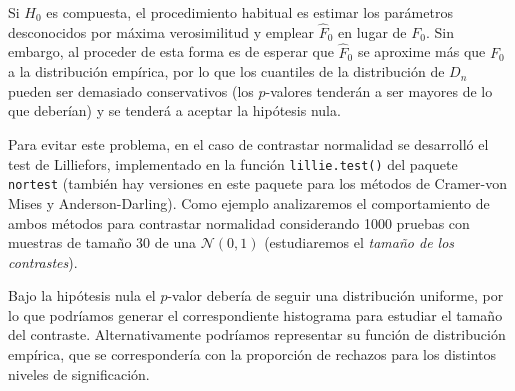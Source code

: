 \documentclass[
]{book}
\newenvironment{Shaded}{\begin{snugshade}}{\end{snugshade}}
\newcommand{\CommentTok}[1]{\textcolor[rgb]{0.56,0.35,0.01}{\textit{#1}}}
\newcommand{\ControlFlowTok}[1]{\textcolor[rgb]{0.13,0.29,0.53}{\textbf{#1}}}
\newcommand{\DecValTok}[1]{\textcolor[rgb]{0.00,0.00,0.81}{#1}}
\newcommand{\FunctionTok}[1]{\textcolor[rgb]{0.00,0.00,0.00}{#1}}
\newcommand{\NormalTok}[1]{#1}
\newcommand{\OtherTok}[1]{\textcolor[rgb]{0.56,0.35,0.01}{#1}}
\newcommand{\SpecialCharTok}[1]{\textcolor[rgb]{0.00,0.00,0.00}{#1}}
\newcommand{\StringTok}[1]{\textcolor[rgb]{0.31,0.60,0.02}{#1}}
\theoremstyle{break}
\theoremstyle{definition}
\theoremstyle{definition}
\theoremstyle{definition}
\theoremstyle{definition}
\theoremstyle{remark}
\begin{document}
Si \(H_0\) es compuesta, el procedimiento habitual es estimar los parámetros desconocidos
por máxima verosimilitud y emplear \(\hat{F}_0\) en lugar de \(F_0\).
Sin embargo, al proceder de esta forma es de esperar que \(\hat{F}_0\) se aproxime más
que \(F_0\) a la distribución empírica, por lo que los cuantiles de la distribución de
\(D_n\) pueden ser demasiado conservativos (los \(p\)-valores tenderán a ser mayores de
lo que deberían) y se tenderá a aceptar la hipótesis nula.

Para evitar este problema, en el caso de contrastar normalidad se desarrolló el test
de Lilliefors, implementado en la función \texttt{lillie.test()} del paquete \texttt{nortest}
(también hay versiones en este paquete para los métodos de Cramer-von Mises y
Anderson-Darling). Como ejemplo analizaremos el comportamiento de ambos métodos
para contrastar normalidad considerando 1000 pruebas con muestras de tamaño 30 de
una \(\mathcal{N}(0,1)\) (estudiaremos el \emph{tamaño de los contrastes}).

\begin{Shaded}
\end{Shaded}

Bajo la hipótesis nula el \(p\)-valor debería de seguir una distribución uniforme,
por lo que podríamos generar el correspondiente histograma para estudiar el
tamaño del contraste. Alternativamente podríamos representar su función de
distribución empírica, que se correspondería con la proporción de rechazos
para los distintos niveles de significación.
\end{document}
